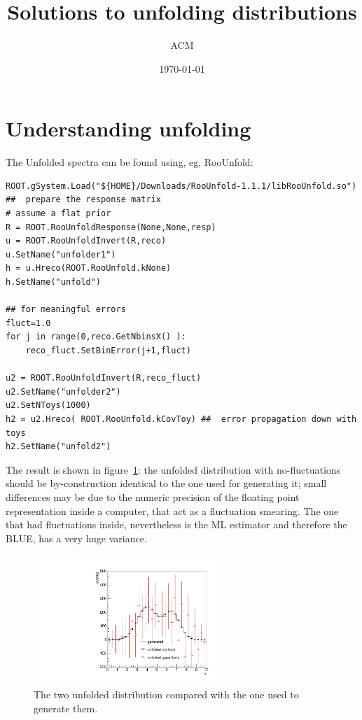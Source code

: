 \documentclass[a4paper,11pt]{article}
\title{Solutions to unfolding distributions}
\author{ACM}
\date{\today}
\begin{document}
\maketitle

\section{Understanding unfolding}

The Unfolded spectra can be found using, eg, RooUnfold:
\begin{verbatim}
ROOT.gSystem.Load("${HOME}/Downloads/RooUnfold-1.1.1/libRooUnfold.so")
##  prepare the response matrix
# assume a flat prior
R = ROOT.RooUnfoldResponse(None,None,resp)
u = ROOT.RooUnfoldInvert(R,reco)
u.SetName("unfolder1")
h = u.Hreco(ROOT.RooUnfold.kNone) 
h.SetName("unfold")

## for meaningful errors
fluct=1.0
for j in range(0,reco.GetNbinsX() ):
	reco_fluct.SetBinError(j+1,fluct)

u2 = ROOT.RooUnfoldInvert(R,reco_fluct)
u2.SetName("unfolder2")
u2.SetNToys(1000)
h2 = u2.Hreco( ROOT.RooUnfold.kCovToy) ##  error propagation down with toys
h2.SetName("unfold2")

\end{verbatim}

The result is shown in figure~\ref{fig:sol1}: the unfolded distribution with no-fluctuations should be by-construction identical to the one used for generating it; 
small differences may be due to the numeric precision of the floating point representation inside a computer, that act as a fluctuation smearing. 
The one that had fluctuations inside, nevertheless is the \gls{ML} estimator and therefore the \gls{BLUE}, has a very huge variance.

\begin{figure}[H]
	\centering
	\includegraphics[width=0.618\textwidth]{figs/gen-unfold.pdf}
	\caption{ \label{fig:sol1} The two unfolded distribution compared with the one used to generate them.}
\end{figure}

\FloatBarrier
\end{document}
